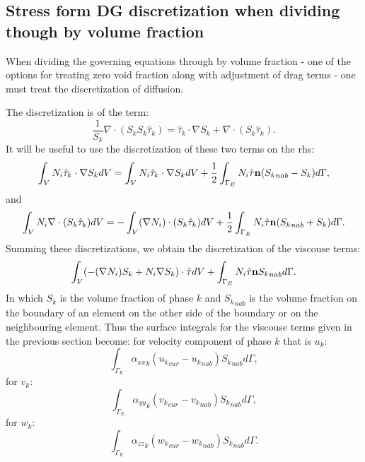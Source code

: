 \subsection{Stress form DG discretization when dividing though by volume fraction} 
When dividing the governing equations through by volume fraction - one of 
the options for treating zero void fraction along with adjustment of drag terms - 
one must treat the discretization of diffusion. 

The discretization is of the term:
 \begin{equation}
\frac{1}{S_k} \nabla \cdot (S_k S_k \hat\tau_k ) =
\hat\tau_k \cdot \nabla S_k + \nabla \cdot (S_k \hat\tau_k). 
\label{form-derivs-dg-visc}
\end{equation}
It will be useful to use the discretization of these two terms on the rhs:
 \begin{equation}
\int_V N_i \hat \tau_k \cdot \nabla S_k dV 
=\int_V N_i \hat \tau_k \cdot \nabla S_k dV 
+\frac{1}{2}\int_{\Gamma_E} N_i \hat\tau {\bf n} ( {S_k}_{nab} - S_k ) d\Gamma, 
\end{equation}
and 
 \begin{equation}
\int_V N_i \nabla \cdot (S_k \hat \tau_k)  dV 
=
- \int_V (\nabla N_i) \cdot (S_k \hat \tau_k)  dV 
+\frac{1}{2}\int_{\Gamma_E} N_i \hat\tau {\bf n} ( {S_k}_{nab} + S_k ) d\Gamma. 
\end{equation}
Summing these discretizations, we obtain the discretization of the viscouse terms: 
 \begin{equation}
\int_V (-(\nabla N_i)S_k + N_i \nabla S_k)\cdot \hat \tau dV 
+\int_{\Gamma_E} N_i \hat\tau {\bf n}  {S_k}_{nab}  d\Gamma. 
\end{equation}
In which $S_k$ is the volume fraction of phase $k$ and ${S_k}_{nab}$ is the 
volume fraction on the boundary of an element on the other side of the boundary or on the 
neighbouring element.  
Thus the surface integrals for the viscouse terms given in the previous section 
become: 
for velocity component of phase $k$ that is $u_k$:
\begin{equation}
\int_{\Gamma_E} {\alpha_{xx}}_k ({u_k}_{cur}-{u_k}_{nab}) {S_k}_{nab} d\Gamma,
\end{equation}
for $v_k$:
\begin{equation}
\int_{\Gamma_E} {\alpha_{yy}}_k ({v_k}_{cur}-{v_k}_{nab}) {S_k}_{nab} d\Gamma,
\end{equation}
for $w_k$:
\begin{equation}
\int_{\Gamma_E} {\alpha_{zz}}_k ({w_k}_{cur}-{w_k}_{nab}) {S_k}_{nab} d\Gamma. 
\end{equation}




